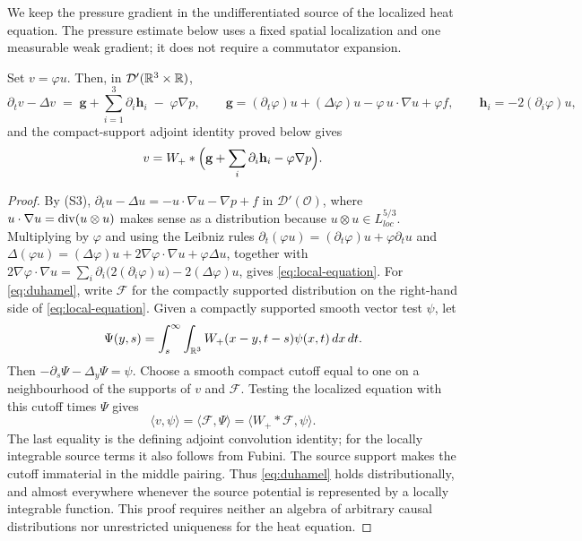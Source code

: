 \documentclass[11pt,reqno]{amsart}
\begin{document}
We keep the pressure gradient in the undifferentiated source of the
localized heat equation. The pressure estimate below uses a fixed spatial
localization and one measurable weak gradient; it does not require a
commutator expansion.

\begin{lemma}\label{lem:local-equation}
Set $v=\varphi u$. Then, in $\mathcal{D}'(\mathbb{R}^{3}\times\mathbb{R})$,
\begin{equation}\label{eq:local-equation}
  \partial_{t}v-\Delta v
  \;=\;\mathbf{g}+\sum_{i=1}^{3}\partial_{i}\mathbf{h}_{i}
   \;-\;\varphi\nabla p,
  \qquad
  \mathbf{g}=(\partial_{t}\varphi)u+(\Delta\varphi)u-\varphi\,u\cdot\nabla u+\varphi f,
  \qquad
  \mathbf{h}_{i}=-2(\partial_{i}\varphi)u ,
\end{equation}
and the compact-support adjoint identity proved below gives
\begin{equation}\label{eq:duhamel}
  v=W_{+}*\Bigl(\mathbf{g}+\sum_{i}\partial_{i}\mathbf{h}_{i}-\varphi\nabla p\Bigr).
\end{equation}
\end{lemma}

\begin{proof}
By (S3), $\partial_{t}u-\Delta u=-u\cdot\nabla u-\nabla p+f$ in
$\mathcal{D}'(\mathcal{O})$, where $u\cdot\nabla u=\operatorname{div}(u\otimes u)$ makes sense
as a distribution because $u\otimes u\in L^{5/3}_{loc}$. Multiplying by
$\varphi$ and using the Leibniz rules
$\partial_{t}(\varphi u)=(\partial_{t}\varphi)u+\varphi\partial_{t}u$ and
$\Delta(\varphi u)=(\Delta\varphi)u+2\nabla\varphi\cdot\nabla u+\varphi\Delta u$,
together with
$2\nabla\varphi\cdot\nabla u=\sum_{i}\partial_{i}\bigl(2(\partial_{i}\varphi)u\bigr)
 -2(\Delta\varphi)u$, gives \eqref{eq:local-equation}. For \eqref{eq:duhamel}, write
$\mathcal F$ for the compactly supported distribution on the right-hand
side of \eqref{eq:local-equation}. Given a compactly supported smooth
vector test $\psi$, let
\[
 \Psi(y,s)=\int_s^\infty\int_{\mathbb{R}^3}
                 W_+(x-y,t-s)\psi(x,t)\,dx\,dt .
\]
Then $-\partial_s\Psi-\Delta_y\Psi=\psi$.
Choose a smooth compact cutoff equal to one on a neighbourhood of the
supports of $v$ and $\mathcal F$. Testing the localized equation with
this cutoff times $\Psi$ gives
\[
 \langle v,\psi\rangle
   =\langle\mathcal F,\Psi\rangle
   =\langle W_+*\mathcal F,\psi\rangle .
\]
The last equality is the defining adjoint convolution identity; for the
locally integrable source terms it also follows from Fubini. The source
support makes the cutoff immaterial in the middle pairing. Thus
\eqref{eq:duhamel} holds distributionally, and almost everywhere whenever
the source potential is represented by a locally integrable function.
This proof requires neither an algebra of arbitrary causal distributions
nor unrestricted uniqueness for the heat equation.
\end{proof}
\end{document}
